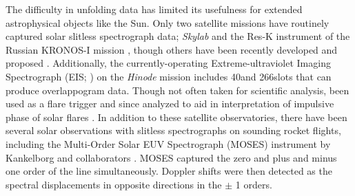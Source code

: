     The difficulty in unfolding  data has limited its usefulness for extended astrophysical objects like the Sun. 
    Only two satellite missions have routinely captured solar slitless spectrograph data; {\it Skylab} \citep{Tousey1973} and the Res-K instrument of the Russian KRONOS-I mission \citep{Zhitnik1998}, though others have been recently developed and proposed \citep{winebarger2019,golub2020}. Additionally, the currently-operating Extreme-ultraviolet Imaging Spectrograph (EIS; \citet{culhane2007}) on the {\it Hinode} mission \citep{kosugi2007} includes 40\arcsec and 266\arcsec slots that can produce overlappogram data.  Though  not often taken for scientific analysis,  been used as a flare trigger and since analyzed to aid in interpretation of impulsive phase of solar flares \citep{harra2017,harra2020}.
    In addition to these satellite observatories, there have been several solar observations with slitless spectrographs on sounding rocket flights, including the Multi-Order Solar EUV Spectrograph (MOSES) instrument by Kankelborg and collaborators \citep{Kankelborg01,Fox10}.
    MOSES captured the zero and plus and minus one order of the \heii line simultaneously. Doppler shifts were then detected as the spectral displacements in opposite directions in the $\pm$ 1 orders.
    
